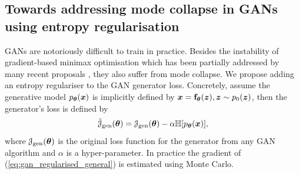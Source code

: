 \subsection{Towards addressing mode collapse in GANs using entropy regularisation}
GANs are notoriously difficult to train in practice. Besides the instability of gradient-based minimax optimisation which has been partially addressed by many recent proposals \citep{salimans:training2016, arjovsky:wgan2017, berthelot:began2017}, they also suffer from mode collapse. We propose adding an entropy regulariser to the GAN generator loss. Concretely, assume the generative model $p_{\bm{\theta}}(\bm{x})$ is implicitly defined by $\bm{x} = \mathbf{f}_{\bm{\theta}}(\bm{z}), \bm{z} \sim p_0(\bm{z})$, then the generator's loss is defined by 
\begin{equation}
\tilde{\mathcal{J}}_{\text{gen}}(\bm{\theta}) = \mathcal{J}_{\text{gen}}(\bm{\theta}) - \alpha \mathbb{H}[p_{\bm{\theta}}(\bm{x})],
\label{eq:gan_regularised_general}
\end{equation}
where $\mathcal{J}_{\text{gen}}(\bm{\theta})$ is the original loss function for the generator from any GAN algorithm and $\alpha$ is a hyper-parameter. In practice the gradient of (\ref{eq:gan_regularised_general}) is estimated using Monte Carlo.

